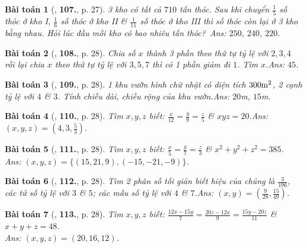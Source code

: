 \documentclass{article}
\numberwithin{equation}{section}
\newtheorem{baitoan}{Bài toán}
\begin{document}
\begin{baitoan}[\cite{Tuyen_Toan_7}, \textbf{107.}, p. 27]
	3 kho có tất cả $710$ tấn thóc. Sau khi chuyển $\frac{1}{5}$ số thóc ở kho I, $\frac{1}{6}$ số thóc ở kho II \& $\frac{1}{11}$ số thóc ở kho III thì số thóc còn lại ở 3 kho bằng nhau. Hỏi lúc đầu mỗi kho có bao nhiêu tấn thóc?\ \hfill{\sf Ans:} $250$, $240$, $220$.
\end{baitoan}

\begin{baitoan}[\cite{Tuyen_Toan_7}, \textbf{108.}, p. 28]
	Chia số $x$ thành 3 phần theo thứ tự tỷ lệ với $2,3,4$ rồi lại chia $x$ theo thứ tự tỷ lệ với $3,5,7$ thì có 1 phần giảm đi $1$. Tìm $x$.\hfill{\sf Ans:} $45$.
\end{baitoan}

\begin{baitoan}[\cite{Tuyen_Toan_7}, \textbf{109.}, p. 28]
	1 khu vườn hình chữ nhật có diện tích $\rm300m^2$, 2 cạnh tỷ lệ với $4$ \& $3$. Tính chiều dài, chiều rộng của khu vườn.\hfill{\sf Ans:} $20$\emph{m}, $15$\emph{m}.
\end{baitoan}

\begin{baitoan}[\cite{Tuyen_Toan_7}, \textbf{110.}, p. 28]
	Tìm $x,y,z$ biết: $\frac{x}{12} = \frac{y}{9} = \frac{z}{5}$ \& $xyz = 20$.\hfill{\sf Ans:} $(x,y,z) = \left(4,3,\frac{5}{3}\right)$.
\end{baitoan}

\begin{baitoan}[\cite{Tuyen_Toan_7}, \textbf{111.}, p. 28]
	Tìm $x,y,z$ biết: $\frac{x}{5} = \frac{y}{7} = \frac{z}{3}$ \& $x^2 + y^2 + z^2 = 385$.\\\mbox{}\hfill{\sf Ans:} $(x,y,z) = \{(15,21,9),(-15,-21,-9)\}$.
\end{baitoan}

\begin{baitoan}[\cite{Tuyen_Toan_7}, \textbf{112.}, p. 28]
	Tìm 2 phân số tối giản biết hiệu của chúng là $\frac{3}{196}$, các tử số tỷ lệ với $3$ \& $5$; các mẫu số tỷ lệ với $4$ \& $7$.\hfill{\sf Ans:} $(x,y) = \left(\frac{9}{28},\frac{15}{49}\right)$.
\end{baitoan}

\begin{baitoan}[\cite{Tuyen_Toan_7}, \textbf{113.}, p. 28]
	Tìm $x,y,z$ biết: $\frac{12x - 15y}{7} = \frac{20z - 12x}{9} = \frac{15y - 20z}{11}$ \& $x + y + z = 48$.\\\mbox{}\hfill{\sf Ans:} $(x,y,z) = (20,16,12)$.
\end{baitoan}
\end{document}
